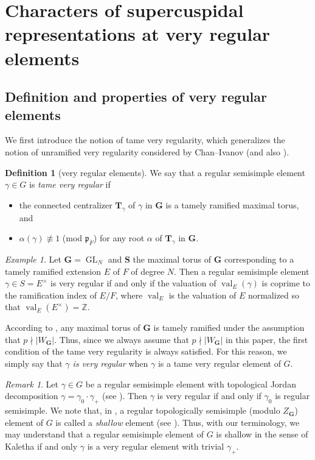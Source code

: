 \documentclass{amsart}
\newcommand{\ol}{\overline}
\newcommand{\bfT}{\mathbf{T}}
\newcommand{\Z}{\mathbb{Z}}
\newcommand{\bfG}{\mathbf{G}}
\newcommand{\bfS}{\mathbf{S}}
\DeclareMathOperator{\val}{val}
\DeclareMathOperator{\GL}{GL}
\theoremstyle{plain}
\theoremstyle{definition}
\newtheorem{definition}[thm]{Definition}
\theoremstyle{remark}
\newtheorem{rem}[thm]{Remark}
\newtheorem{example}[thm]{Example}
\theoremstyle{theorem}
\begin{document}
\section{Characters of supercuspidal representations at very regular elements}\label{sec:character}

\subsection{Definition and properties of very regular elements}\label{subsec:vreg}

We first introduce the notion of tame very regularity, which generalizes the notion of unramified very regularity considered by Chan--Ivanov \cite{CI21-RT} (and also \cite{CO21}).

\begin{definition}[very regular elements]
We say that a regular semisimple element $\gamma \in G$ is \textit{tame very regular} if
\begin{itemize}
\item
the connected centralizer $\bfT_{\gamma}$ of $\gamma$ in $\bfG$ is a tamely ramified maximal torus, and
\item
 $\alpha(\gamma) \not\equiv 1$ (mod $\mathfrak{p}_{\ol{F}}$) for any root $\alpha$ of $\bfT_{\gamma}$ in $\bfG$.
 \end{itemize}
\end{definition}

\begin{example}
Let $\bfG = \GL_N$ and $\bfS$ the maximal torus of $\bfG$ corresponding to a tamely ramified extension $E$ of $F$ of  degree $N$.
Then a regular semisimple element $\gamma\in S=E^{\times}$ is very regular if and only if the valuation of $\val_{E}(\gamma)$ is coprime to the ramification index of $E/F$, where $\val_{E}$ is the valuation of $E$ normalized so that $\val_{E}(E^{\times})=\Z$.
\end{example}

According to \cite[Corollary 2.6]{Fin21-IMRN}, any maximal torus of $\bfG$ is tamely ramified under the assumption that $p\nmid|W_{\bfG}|$.
Thus, since we always assume that $p\nmid|W_{\bfG}|$ in this paper, the first condition of the tame very regularity is always satisfied.
For this reason, we simply say that \textit{$\gamma$ is very regular} when $\gamma$ is a tame very regular element of $G$.

\begin{rem}\label{rem:shallow}
Let $\gamma\in G$ be a regular semisimple element with topological Jordan decomposition $\gamma=\gamma_{0}\cdot\gamma_{+}$ (see \cite{Spi08}).
Then $\gamma$ is very regular if and only if $\gamma_{0}$ is regular semisimple.
We note that, in \cite{Kal19}, a regular topologically semisimple (modulo $Z_{\bfG}$) element of $G$ is called a \textit{shallow} element (see \cite[Section 4.10]{Kal19}).
Thus, with our terminology, we may understand that a regular semisimple element of $G$ is shallow in the sense of Kaletha if and only $\gamma$ is a very regular element with trivial $\gamma_{+}$.
\end{rem}
\end{document}
